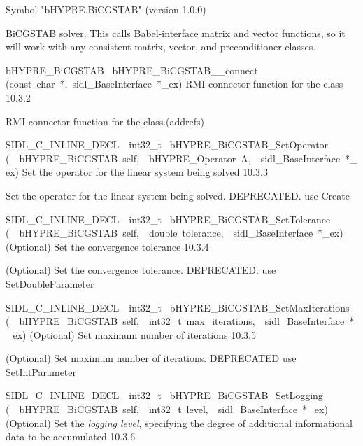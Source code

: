 \documentclass{article}
\begin{document}
\begin{cxxentry}
\begin{cxxentry}
\begin{cxxvariable}
\begin{cxxdoc}
Symbol "bHYPRE.BiCGSTAB" (version 1.0.0)

BiCGSTAB solver.
This calls Babel-interface matrix and vector functions, so it will work
with any consistent matrix, vector, and preconditioner classes.
\end{cxxdoc}
\end{cxxvariable}
\begin{cxxfunction}
{bHYPRE\_BiCGSTAB\ }
        {bHYPRE\_BiCGSTAB\_\_connect}
        {(const\ char\ *,\ sidl\_BaseInterface\ *\_ex)}
        {
RMI connector function for the class}
        {10.3.2}
\begin{cxxdoc}

RMI connector function for the class.(addrefs)
\end{cxxdoc}
\end{cxxfunction}
\begin{cxxfunction}
{SIDL\_C\_INLINE\_DECL\ \ int32\_t\ }
        {bHYPRE\_BiCGSTAB\_SetOperator}
        {(\ \ bHYPRE\_BiCGSTAB\ self,\ \ bHYPRE\_Operator\ A,\ \ sidl\_BaseInterface\ *\_ex)}
        {
Set the operator for the linear system being solved}
        {10.3.3}
\begin{cxxdoc}

Set the operator for the linear system being solved.
DEPRECATED.  use Create
\end{cxxdoc}
\end{cxxfunction}
\begin{cxxfunction}
{SIDL\_C\_INLINE\_DECL\ \ int32\_t\ }
        {bHYPRE\_BiCGSTAB\_SetTolerance}
        {(\ \ bHYPRE\_BiCGSTAB\ self,\ \ double\ tolerance,\ \ sidl\_BaseInterface\ *\_ex)}
        {
(Optional) Set the convergence tolerance}
        {10.3.4}
\begin{cxxdoc}

(Optional) Set the convergence tolerance.
DEPRECATED.  use SetDoubleParameter
\end{cxxdoc}
\end{cxxfunction}
\begin{cxxfunction}
{SIDL\_C\_INLINE\_DECL\ \ int32\_t\ }
        {bHYPRE\_BiCGSTAB\_SetMaxIterations}
        {(\ \ bHYPRE\_BiCGSTAB\ self,\ \ int32\_t\ max\_iterations,\ \ sidl\_BaseInterface\ *\_ex)}
        {
(Optional) Set maximum number of iterations}
        {10.3.5}
\begin{cxxdoc}

(Optional) Set maximum number of iterations.
DEPRECATED   use SetIntParameter
\end{cxxdoc}
\end{cxxfunction}
\begin{cxxfunction}
{SIDL\_C\_INLINE\_DECL\ \ int32\_t\ }
        {bHYPRE\_BiCGSTAB\_SetLogging}
        {(\ \ bHYPRE\_BiCGSTAB\ self,\ \ int32\_t\ level,\ \ sidl\_BaseInterface\ *\_ex)}
        {
(Optional) Set the {\it logging level}, specifying the degree
of additional informational data to be accumulated}
        {10.3.6}
\begin{cxxdoc}


\end{cxxdoc}
\end{cxxfunction}
\end{cxxentry}
\end{cxxentry}
\end{document}
